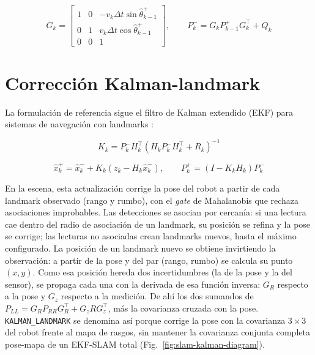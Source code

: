 \[
G_k =
\begin{bmatrix}
1 & 0 & -v_k\Delta t\sin\hat{\theta}_{k-1}^{+}\\
0 & 1 &  v_k\Delta t\cos\hat{\theta}_{k-1}^{+}\\
0 & 0 & 1
\end{bmatrix},
\qquad
P_k^- = G_k P_{k-1}^+ G_k^\top + Q_k
\]

\section{Corrección Kalman-landmark}

La formulación de referencia sigue el filtro de Kalman extendido (EKF) para sistemas de navegación con landmarks \cite{thrun2005}:

\[
K_k = P_k^-H_k^\top(H_kP_k^-H_k^\top + R_k)^{-1}
\]

\[
\hat{x}_k^+ = \hat{x}_k^- + K_k(z_k-H_k\hat{x}_k^-),\qquad
P_k^+ = (I-K_kH_k)P_k^-
\]

En la escena, esta actualización corrige la pose del robot a partir de cada
landmark observado (rango y rumbo), con el \emph{gate} de Mahalanobis que rechaza
asociaciones improbables. Las detecciones se asocian por cercanía: si una lectura
cae dentro del radio de asociación de un landmark, su posición se refina y la
pose se corrige; las lecturas no asociadas crean landmarks nuevos, hasta el
máximo configurado. La posición de un landmark nuevo se obtiene invirtiendo la
observación: a partir de la pose y del par (rango, rumbo) se calcula su punto
\((x,y)\). Como esa posición hereda dos incertidumbres (la de la pose y la del
sensor), se propaga cada una con la derivada de esa función inversa: \(G_R\)
respecto a la pose y \(G_z\) respecto a la medición. De ahí los dos sumandos de
\(P_{LL}=G_R P_{RR} G_R^\top+G_z R G_z^\top\), más la covarianza cruzada con la
pose. \texttt{KALMAN\_LANDMARK} se denomina así
porque corrige la pose con la covarianza \(3\times3\) del robot frente al mapa de
rasgos, sin mantener la covarianza conjunta completa pose-mapa de un EKF-SLAM
total (Fig.~\ref{fig:slam-kalman-diagram}).


